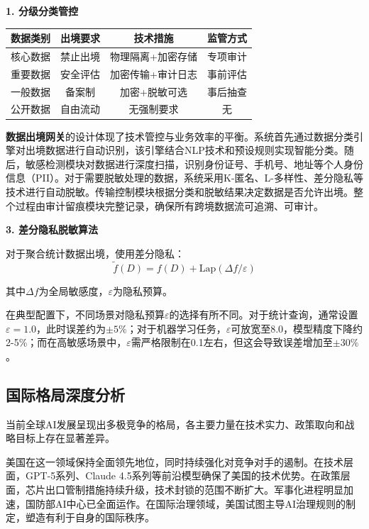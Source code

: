 \textbf{1. 分级分类管控}

\begin{table}[H]
\centering
\small
\begin{tabular}{lccc}
\toprule
\textbf{数据类别} & \textbf{出境要求} & \textbf{技术措施} & \textbf{监管方式} \\
\midrule
核心数据 & 禁止出境 & 物理隔离+加密存储 & 专项审计 \\
重要数据 & 安全评估 & 加密传输+审计日志 & 事前评估 \\
一般数据 & 备案制 & 加密+脱敏可选 & 事后抽查 \\
公开数据 & 自由流动 & 无强制要求 & 无 \\
\bottomrule
\end{tabular}
\end{table}

\textbf{数据出境网关}的设计体现了技术管控与业务效率的平衡。系统首先通过数据分类引擎对出境数据进行自动识别，该引擎结合NLP技术和预设规则实现智能分类。随后，敏感检测模块对数据进行深度扫描，识别身份证号、手机号、地址等个人身份信息（PII）。对于需要脱敏处理的数据，系统采用K-匿名、L-多样性、差分隐私等技术进行自动脱敏。传输控制模块根据分类和脱敏结果决定数据是否允许出境。整个过程由审计留痕模块完整记录，确保所有跨境数据流可追溯、可审计。

\textbf{3. 差分隐私脱敏算法}

对于聚合统计数据出境，使用差分隐私：
\begin{equation}
\tilde{f}(D) = f(D) + \text{Lap}(\Delta f / \varepsilon)
\end{equation}

其中$\Delta f$为全局敏感度，$\varepsilon$为隐私预算。

在典型配置下，不同场景对隐私预算$\varepsilon$的选择有所不同。对于统计查询，通常设置$\varepsilon=1.0$，此时误差约为$\pm 5\%$；对于机器学习任务，$\varepsilon$可放宽至8.0，模型精度下降约2-5\%；而在高敏感场景中，$\varepsilon$需严格限制在0.1左右，但这会导致误差增加至$\pm 30\%$。

\subsection{国际格局深度分析}

当前全球AI发展呈现出多极竞争的格局，各主要力量在技术实力、政策取向和战略目标上存在显著差异。

美国在这一领域保持全面领先地位，同时持续强化对竞争对手的遏制。在技术层面，GPT-5系列、Claude 4.5系列等前沿模型确保了美国的技术优势。在政策层面，芯片出口管制措施持续升级，技术封锁的范围不断扩大。军事化进程明显加速，国防部AI中心已全面运作。在国际治理领域，美国试图主导AI治理规则的制定，塑造有利于自身的国际秩序。


